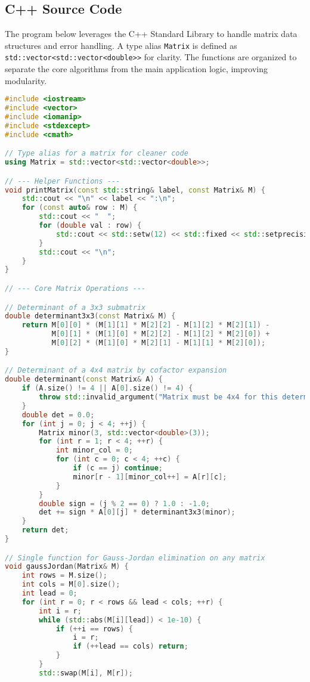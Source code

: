 \documentclass{article}
\begin{document}
\subsection{C++ Source Code}

The program below leverages the C++ Standard Library to handle matrix data structures and error handling. A type alias \texttt{Matrix} is defined as \texttt{std::vector<std::vector<double>>} for clarity. The functions are organized to separate the core algorithms from the main application logic, improving modularity.

\begin{lstlisting}[language=C++, caption={Modern C++ code for RREF, determinant, and inverse of a 4x4 matrix.}, label=lst:code, basicstyle=\footnotesize\ttfamily, breaklines=true]
#include <iostream>
#include <vector>
#include <iomanip>
#include <stdexcept>
#include <cmath>

// Type alias for a matrix for cleaner code
using Matrix = std::vector<std::vector<double>>;

// --- Helper Functions ---
void printMatrix(const std::string& label, const Matrix& M) {
    std::cout << "\n" << label << ":\n";
    for (const auto& row : M) {
        std::cout << "  ";
        for (double val : row) {
            std::cout << std::setw(12) << std::fixed << std::setprecision(6) << val << " ";
        }
        std::cout << "\n";
    }
}

// --- Core Matrix Operations ---

// Determinant of a 3x3 submatrix
double determinant3x3(const Matrix& M) {
    return M[0][0] * (M[1][1] * M[2][2] - M[1][2] * M[2][1]) -
           M[0][1] * (M[1][0] * M[2][2] - M[1][2] * M[2][0]) +
           M[0][2] * (M[1][0] * M[2][1] - M[1][1] * M[2][0]);
}

// Determinant of a 4x4 matrix by cofactor expansion
double determinant(const Matrix& A) {
    if (A.size() != 4 || A[0].size() != 4) {
        throw std::invalid_argument("Matrix must be 4x4 for this determinant function.");
    }
    double det = 0.0;
    for (int j = 0; j < 4; ++j) {
        Matrix minor(3, std::vector<double>(3));
        for (int r = 1; r < 4; ++r) {
            int minor_col = 0;
            for (int c = 0; c < 4; ++c) {
                if (c == j) continue;
                minor[r - 1][minor_col++] = A[r][c];
            }
        }
        double sign = (j % 2 == 0) ? 1.0 : -1.0;
        det += sign * A[0][j] * determinant3x3(minor);
    }
    return det;
}

// Single function for Gauss-Jordan elimination on any matrix
void gaussJordan(Matrix& M) {
    int rows = M.size();
    int cols = M[0].size();
    int lead = 0;
    for (int r = 0; r < rows && lead < cols; ++r) {
        int i = r;
        while (std::abs(M[i][lead]) < 1e-10) {
            if (++i == rows) {
                i = r;
                if (++lead == cols) return;
            }
        }
        std::swap(M[i], M[r]);
        

\end{lstlisting}
\end{document}
